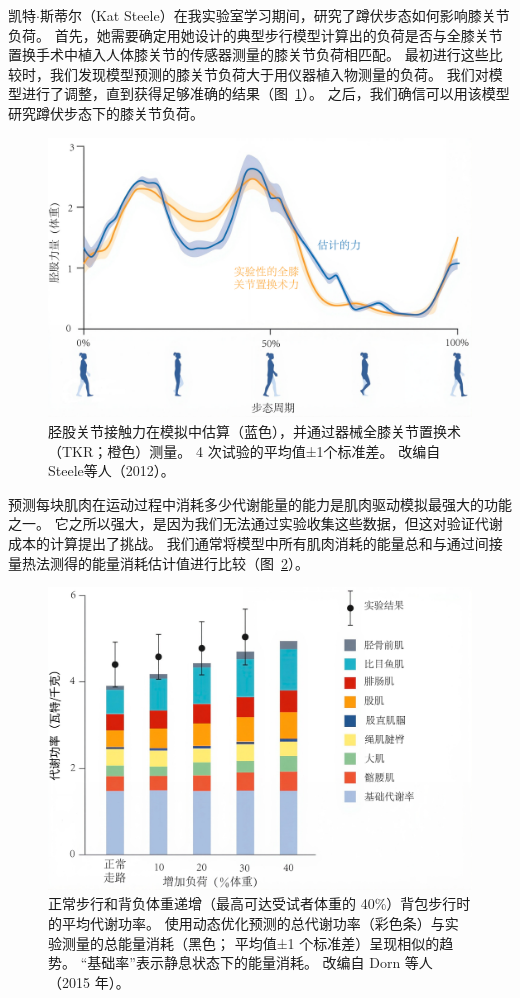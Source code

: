 凯特$\cdot$斯蒂尔（Kat Steele）在我实验室学习期间，研究了蹲伏步态如何影响膝关节负荷。
首先，她需要确定用她设计的典型步行模型计算出的负荷是否与全膝关节置换手术中植入人体膝关节的传感器测量的膝关节负荷相匹配。
最初进行这些比较时，我们发现模型预测的膝关节负荷大于用仪器植入物测量的负荷。
我们对模型进行了调整，直到获得足够准确的结果（图~\ref{fig:10_12}）。
之后，我们确信可以用该模型研究蹲伏步态下的膝关节负荷。


\begin{figure}[!htb]
	\centering
	\includegraphics[width=0.8\linewidth]{chap10/10_12}
	\caption{胫股关节接触力在模拟中估算（蓝色），并通过器械全膝关节置换术（TKR；橙色）测量。
		4 次试验的平均值±1个标准差。
		改编自Steele等人（2012）。 \label{fig:10_12}}
\end{figure}


预测每块肌肉在运动过程中消耗多少代谢能量的能力是肌肉驱动模拟最强大的功能之一。
它之所以强大，是因为我们无法通过实验收集这些数据，但这对验证代谢成本的计算提出了挑战。
我们通常将模型中所有肌肉消耗的能量总和与通过间接量热法测得的能量消耗估计值进行比较（图~\ref{fig:10_13}）。


\begin{figure}[!htb]
	\centering
	\includegraphics[width=0.8\linewidth]{chap10/10_13}
	\caption{正常步行和背负体重递增（最高可达受试者体重的 40\%）背包步行时的平均代谢功率。
		使用动态优化预测的总代谢功率（彩色条）与实验测量的总能量消耗（黑色；
		平均值±1 个标准差）呈现相似的趋势。
		“基础率”表示静息状态下的能量消耗。
		改编自 Dorn 等人（2015 年）。 \label{fig:10_13}}
\end{figure}


